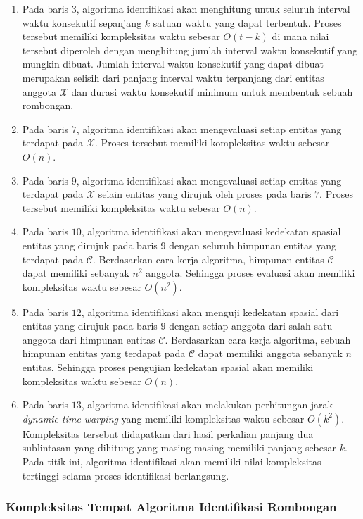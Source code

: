 \begin{enumerate}
    \item Pada baris $3$, algoritma identifikasi akan menghitung untuk seluruh interval waktu konsekutif sepanjang $k$ satuan waktu yang dapat terbentuk. Proses tersebut memiliki kompleksitas waktu sebesar $O(t - k)$ di mana nilai tersebut diperoleh dengan menghitung jumlah interval waktu konsekutif yang mungkin dibuat. Jumlah interval waktu konsekutif yang dapat dibuat merupakan selisih dari panjang interval waktu terpanjang dari entitas anggota $\mathcal{X}$ dan durasi waktu konsekutif minimum untuk membentuk sebuah rombongan.
    \item Pada baris $7$, algoritma identifikasi akan mengevaluasi setiap entitas yang terdapat pada $\mathcal{X}$. Proses tersebut memiliki kompleksitas waktu sebesar $O(n)$.
    \item Pada baris $9$, algoritma identifikasi akan mengevaluasi setiap entitas yang terdapat pada $\mathcal{X}$ selain entitas yang dirujuk oleh proses pada baris $7$. Proses tersebut memiliki kompleksitas waktu sebesar $O(n)$.
    \item Pada baris $10$, algoritma identifikasi akan mengevaluasi kedekatan spasial entitas yang dirujuk pada baris $9$ dengan seluruh himpunan entitas yang terdapat pada $\mathcal{C}$. Berdasarkan cara kerja algoritma, himpunan entitas $\mathcal{C}$ dapat memiliki sebanyak $n^2$ anggota. Sehingga proses evaluasi akan memiliki kompleksitas waktu sebesar $O(n^2)$.
    \item Pada baris $12$, algoritma identifikasi akan menguji kedekatan spasial dari entitas yang dirujuk pada baris $9$ dengan setiap anggota dari salah satu anggota dari himpunan entitas $\mathcal{C}$. Berdasarkan cara kerja algoritma, sebuah himpunan entitas yang terdapat pada $\mathcal{C}$ dapat memiliki anggota sebanyak $n$ entitas. Sehingga proses pengujian kedekatan spasial akan memiliki kompleksitas waktu sebesar $O(n)$.
    \item Pada baris $13$, algoritma identifikasi akan melakukan perhitungan jarak \textit{dynamic time warping} yang memiliki kompleksitas waktu sebesar $O(k^2)$. Kompleksitas tersebut didapatkan dari hasil perkalian panjang dua sublintasan yang dihitung yang masing-masing memiliki panjang sebesar $k$. Pada titik ini, algoritma identifikasi akan memiliki nilai kompleksitas tertinggi selama proses identifikasi berlangsung.
\end{enumerate}

\subsubsection{Kompleksitas Tempat Algoritma Identifikasi Rombongan}
\label{subsubsec:space-complexity}

